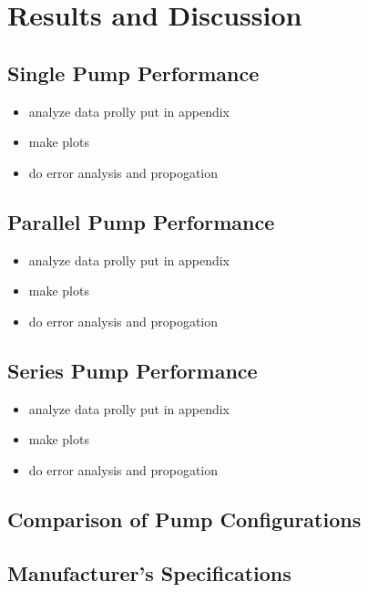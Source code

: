 \section{Results and Discussion}
\subsection{Single Pump Performance}
\begin{itemize}
    \item analyze data prolly put in appendix
    \item make plots
    \item do error analysis and propogation
\end{itemize}   

\subsection{Parallel Pump Performance}
\begin{itemize}
    \item analyze data prolly put in appendix
    \item make plots
    \item do error analysis and propogation
\end{itemize}

\subsection{Series Pump Performance}
\begin{itemize}
    \item analyze data prolly put in appendix
    \item make plots
    \item do error analysis and propogation
\end{itemize}

\subsection{Comparison of Pump Configurations}
\subsection{Manufacturer's Specifications}

